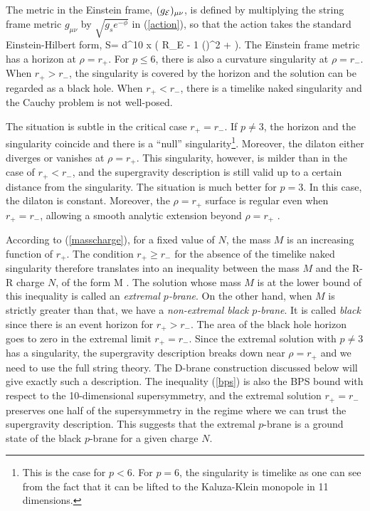 The metric in the Einstein frame, $(g_{\cal E})_{\mu\nu}$, 
is defined by multiplying
the string frame metric $g_{\mu\nu}$ by
$\sqrt{ g_se^{-\phi}}$
in (\ref{action}), so that the action takes the standard
Einstein-Hilbert form, 
\beq
S= \int d^{10} x 
  ( {\cal R}_{\cal E} - {1 } (\nabla \phi)^2 +
\cdots ).
\eeq
The Einstein frame metric has a horizon at $\rho=r_+$. For
$p\leq 6$, there is also a curvature singularity at $\rho=r_-$.
When $r_+ > r_-$, the singularity is covered by the horizon
and the solution can be regarded as a black hole. 
When $r_+ < r_-$, there is a timelike naked singularity
and the Cauchy problem is not well-posed. 

The situation is subtle in the critical case $r_+ = r_-$. 
If $p \neq 3$, the horizon
and the singularity coincide and there is a ``null'' singularity\footnote{
This is the case for $p < 6$. For $p=6$, the singularity is timelike
as one can see from the fact that it can be lifted to the Kaluza-Klein 
monopole in 11 dimensions.}. 
Moreover, the dilaton either diverges or vanishes at $\rho=r_+$. 
This singularity, however, is milder than in the case of $r_+ < r_-$,
and the supergravity description is still valid up to 
a certain distance from the singularity. The situation is
much better for $p=3$. In this case, the dilaton is constant.
Moreover, the $\rho=r_+$ surface is regular even when $r_+=r_-$,
allowing a smooth analytic extension beyond $\rho=r_+$  \cite{Gibbons:1995vm}.


According to (\ref{masscharge}), for a fixed value of $N$, 
the mass $M$ is an increasing
function of $r_+$. The condition $r_+ \geq r_-$ for 
the absence of the timelike naked singularity therefore translates into
an inequality between the mass $M$ and 
the R-R charge $N$, of the form
\beq
   M \geq  {} .
\label{bps}
\eeq
The solution whose mass $M$ is at the lower bound of this inequality
is called an {\it extremal $p$-brane}. On the other hand, 
when $M$ is strictly greater than that, we have
a {\it non-extremal black $p$-brane}. It is called {\it black}
since there is an event horizon for $r_+ > r_-$. 
The area of the black hole horizon goes 
to zero in the extremal limit $r_+ = r_-$. Since
the extremal solution with $p \neq 3$ 
has a  singularity,
the supergravity description breaks down
near $\rho = r_+$ and we need to use the full string
theory.  The D-brane construction discussed below
will give exactly such a description. 
The inequality (\ref{bps}) is 
also the BPS bound with respect to the 10-dimensional 
supersymmetry, and the extremal solution $r_+=r_-$ 
preserves one half of the supersymmetry
in the regime where we can trust the supergravity
description. This suggests that the extremal $p$-brane
is a ground state of the black $p$-brane for a given charge
$N$. 

